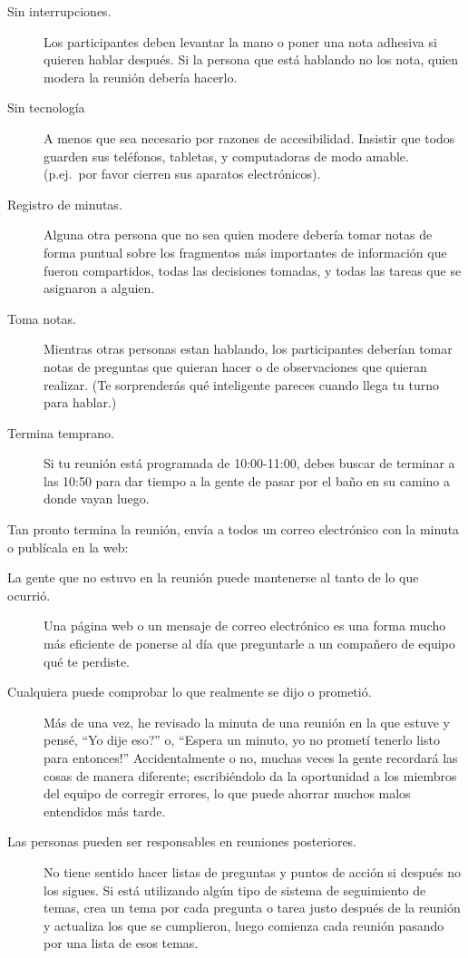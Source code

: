\begin{description}
\item[Sin interrupciones.]
  Los participantes deben levantar la mano o poner una nota adhesiva
  si quieren hablar después.
  Si la persona que está hablando no los nota,
  quien modera la reunión debería hacerlo.

\item[Sin tecnología]
  A menos que sea necesario por razones de accesibilidad.
  Insistir que todos guarden sus teléfonos, tabletas, y computadoras de modo amable.
  (p.ej.\ por favor cierren sus aparatos electrónicos).

\item[Registro de minutas.]
  Alguna otra persona que no sea quien modere debería tomar notas de forma puntual sobre 
  los fragmentos más importantes de información que fueron compartidos,
  todas las decisiones tomadas,
  y todas las tareas que se asignaron a alguien.

\item[Toma notas.]
  Mientras otras personas estan hablando,
  los participantes deberían tomar notas de preguntas que quieran hacer o de observaciones que quieran realizar.
  (Te sorprenderás qué inteligente pareces cuando llega tu turno para hablar.)

\item[Termina temprano.]
  Si tu reunión está programada de 10:00-11:00,
  debes buscar de terminar a las 10:50 para dar tiempo a la gente de pasar por el baño 
  en su camino a donde vayan luego.

\end{description}

Tan pronto termina la reunión,
envía a todos un correo electrónico con la minuta o publícala en la web:

\begin{description}

\item[La gente que no estuvo en la reunión puede mantenerse al tanto de lo que ocurrió.]
  Una página web o un mensaje de correo electrónico es una forma mucho más eficiente de ponerse al día
  que preguntarle a un compañero de equipo qué te perdiste.

\item[Cualquiera puede comprobar lo que realmente se dijo o prometió.]
  Más de una vez,
  he revisado la minuta de una reunión en la que estuve
  y pensé, ``Yo dije eso?''
  o, ``Espera un minuto, yo no prometí tenerlo listo para entonces!''
  Accidentalmente o no,
  muchas veces la gente recordará las cosas de manera diferente;
  escribiéndolo da la oportunidad a los miembros del equipo de corregir errores,
  lo que puede ahorrar muchos malos entendidos más tarde.

\item[Las personas pueden ser responsables en reuniones posteriores.]
  No tiene sentido hacer listas de preguntas y puntos de acción
  si después no los sigues.
  Si está utilizando algún tipo de sistema de seguimiento de temas,
  crea un tema por cada pregunta o tarea justo después de la reunión
  y actualiza los que se cumplieron,
  luego comienza cada reunión pasando por una lista de esos temas.

\end{description}

